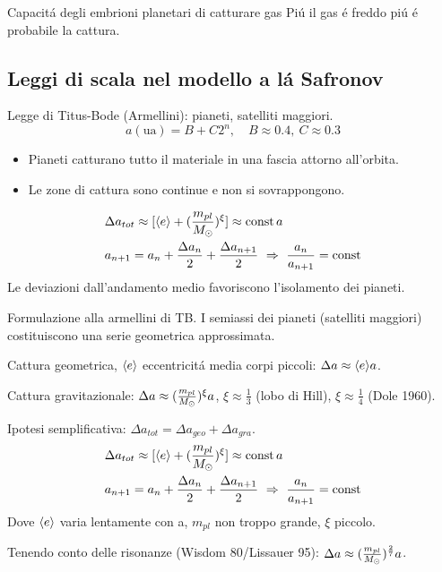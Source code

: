 \begin{wordonframe}{Capacit\'a degli embrioni planetari di catturare gas}
Pi\'u il gas \'e freddo pi\'u \'e probabile la cattura.
\end{wordonframe}

\subsection{Leggi di scala nel modello a l\'a Safronov}

\begin{frame}{Legge di Titus-Bode (Armellini): pianeti, satelliti maggiori.}
\begin{equation*}
a(\si{\astronomicalunit})=B+C 2^n,\quad B\approx0.4,\ C\approx0.3
\end{equation*}
\begin{itemize}
\item Pianeti catturano tutto il materiale in una fascia attorno all'orbita.
\item Le zone di cattura sono continue e non si sovrappongono.
\end{itemize}
\begin{align*}
&\Delta a_{tot}\approx[\exv{e}+(\frac{m_{pl}}{\msun{}})^{\xi}]\approx\const{}a\\
&a_{n+1}=a_n+\frac{\Delta a_n}{2}+\frac{\Delta a_{n+1}}{2}\ \Rightarrow\ \frac{a_n}{a_{n+1}}=\const
\end{align*}
Le deviazioni dall'andamento medio favoriscono l'isolamento dei pianeti.
\end{frame}

\begin{wordonframe}{Formulazione alla armellini di TB.}
I semiassi dei pianeti (satelliti maggiori) costituiscono una serie geometrica approssimata.

Cattura geometrica, $\langle e \rangle$ eccentricit\'a media corpi piccoli: $\Delta a\approx\langle e \rangle a$.

Cattura gravitazionale: $\Delta a\approx(\frac{m_{pl}}{M_{\odot}{}})^{\xi}a$, $\xi\approx\frac{1}{3}$ (lobo di Hill), $\xi\approx\frac{1}{4}$ (Dole 1960).

Ipotesi semplificativa: $\Delta a_{tot}=\Delta a _{geo}+\Delta a_{gra}$.
\begin{align*}
&\Delta a_{tot}\approx[\exv{e}+(\frac{m_{pl}}{\msun{}})^{\xi}]\approx\const{}a\\
&a_{n+1}=a_n+\frac{\Delta a_n}{2}+\frac{\Delta a_{n+1}}{2}\ \Rightarrow\ \frac{a_n}{a_{n+1}}=\const
\end{align*}
Dove $\langle e \rangle$ varia lentamente con a, $m_{pl}$ non troppo grande, $\xi$ piccolo.

Tenendo conto delle risonanze (Wisdom 80/Lissauer 95): $\Delta a\approx(\frac{m_{pl}}{M_{\odot}{}})^{\frac{2}{7}}a$.
\end{wordonframe}

